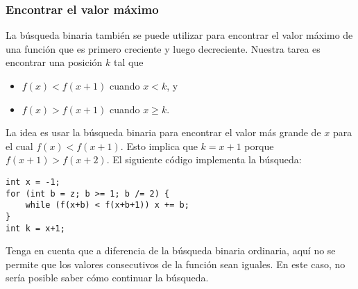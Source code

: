 \subsubsection{Encontrar el valor máximo}

La búsqueda binaria también se puede utilizar para encontrar
el valor máximo de una función que es
primero creciente y luego decreciente.
Nuestra tarea es encontrar una posición $k$ tal que

\begin{itemize}
\item
$f(x)<f(x+1)$ cuando $x<k$, y
\item
$f(x)>f(x+1)$ cuando $x \ge k$.
\end{itemize}

La idea es usar la búsqueda binaria
para encontrar el valor más grande de $x$
para el cual $f(x)<f(x+1)$.
Esto implica que $k=x+1$
porque $f(x+1)>f(x+2)$.
El siguiente código implementa la búsqueda:

\begin{lstlisting}
int x = -1;
for (int b = z; b >= 1; b /= 2) {
    while (f(x+b) < f(x+b+1)) x += b;
}
int k = x+1;
\end{lstlisting}

Tenga en cuenta que a diferencia de la búsqueda binaria ordinaria,
aquí no se permite que los valores consecutivos
de la función sean iguales.
En este caso, no sería posible saber
cómo continuar la búsqueda. 

